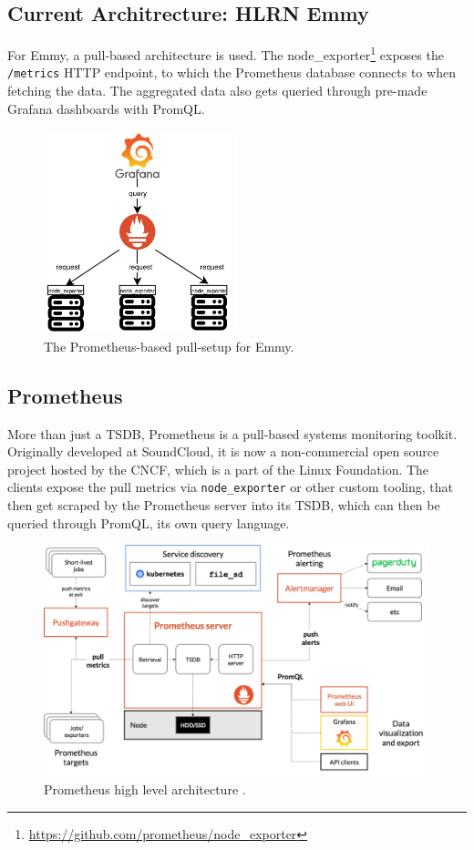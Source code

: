 \subsection{Current Architrecture: HLRN Emmy}
For Emmy, a pull-based architecture is used. The node\_exporter\footnote{
\url{https://github.com/prometheus/node_exporter}} exposes the \texttt{/metrics} HTTP endpoint, to which
the Prometheus database connects to when fetching the data. The aggregated data also gets queried
through pre-made Grafana dashboards with PromQL.

\begin{figure}[H]
  \centering
  \includegraphics[width=0.5\textwidth]{./assets/prometheus.jpeg}
  \caption{The Prometheus-based pull-setup for Emmy.}
\end{figure}

\subsection{Prometheus}
More than just a \ac{TSDB}, Prometheus is a pull-based systems monitoring toolkit. Originally 
developed at SoundCloud, it is now a non-commercial open source project hosted by the \ac{CNCF},
which is a part of the Linux Foundation. The clients expose the pull metrics via \texttt{node\_exporter} or other custom tooling,
that then get scraped by the Prometheus server into its \ac{TSDB}, which can then be queried through
PromQL, its own query language.

\begin{figure}[H]
  \centering
  \includegraphics[width=\textwidth]{./assets/promarch.png}
  \caption{Prometheus high level architecture \cite{promarch}.}
\end{figure}

